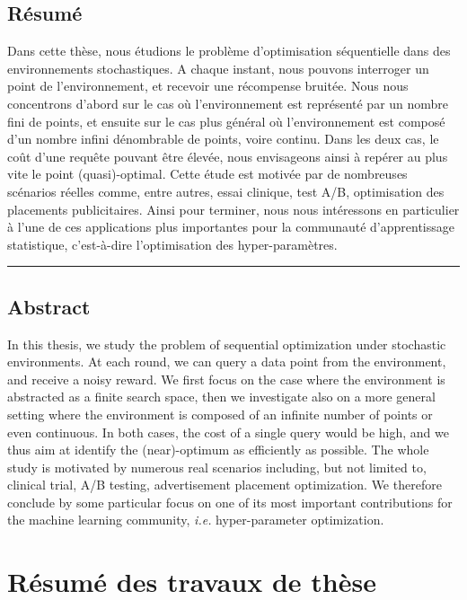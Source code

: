 \section*{\centering R\'esum\'e}

Dans cette th\`ese, nous \'etudions le probl\`eme d'optimisation s\'equentielle dans des enviro\-nnements stochastiques. A chaque instant, nous pouvons interroger un point de l'enviro\-nnement, et recevoir une récompense bruit\'ee. Nous nous concentrons d'abord sur le cas o\`u l'environnement est représenté par un nombre fini de points, et ensuite sur le cas plus g\'en\'eral o\`u l'environnement est composé d'un nombre infini d\'enombrable de points, voire continu. Dans les deux cas, le co\^ut d'une requ\^ete pouvant \^etre \'elev\'ee, nous envisageons ainsi \`a rep\'erer au plus vite le point (quasi)-optimal. Cette \'etude est motiv\'ee par de nombreuses sc\'enarios r\'eelles comme, entre autres, essai clinique, test A/B, optimisation des placements publicitaires. Ainsi pour terminer, nous nous int\'eressons en particulier \`a l'une de ces applications plus importantes pour la communaut\'e d'apprentissage statistique, c'est-\`a-dire l'optimisation des hyper-param\`etres.

\begin{center}
    \rule{8cm}{0.4pt}
\end{center}

\section*{\centering Abstract}

In this thesis, we study the problem of sequential optimization under stochastic environments. At each round, we can query a data point from the environment, and receive a noisy reward. We first focus on the case where the environment is abstracted as a finite search space, then we investigate also on a more general setting where the environment is composed of an infinite number of points or even continuous. In both cases, the cost of a single query would be high, and we thus aim at identify the (near)-optimum as efficiently as possible. The whole study is motivated by numerous real scenarios including, but not limited to, clinical trial, A/B testing, advertisement placement optimization. We therefore conclude by some particular focus on one of its most important contributions for the machine learning community, \emph{i.e.} hyper-parameter optimization.


\chapter*{R\'esum\'e des travaux de thèse}
